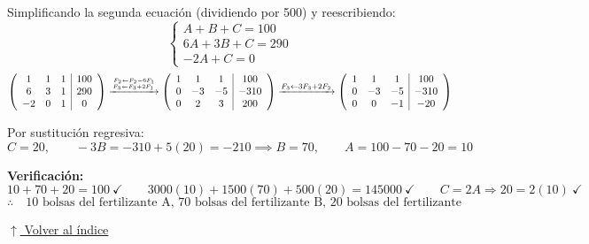 \documentclass[12pt]{article}
\newcommand{\volverindice}{%
    \vspace{1em}%
    \begin{flushright}%
        \hyperlink{indice}{\small $\uparrow$ Volver al índice}%
    \end{flushright}%
}
\begin{document}
Simplificando la segunda ecuación (dividiendo por 500) y reescribiendo:
\[
\begin{cases}
A + B + C = 100\\
6A + 3B + C = 290\\
-2A + C = 0
\end{cases}
\]
\[
\left(\begin{array}{ccc|c}1&1&1&100\\6&3&1&290\\-2&0&1&0\end{array}\right)
\xrightarrow{F_2 \leftarrow F_2 - 6F_1 \atop F_3 \leftarrow F_3 + 2F_1}
\left(\begin{array}{ccc|c}1&1&1&100\\0&-3&-5&-310\\0&2&3&200\end{array}\right)
\xrightarrow{F_3 \leftarrow 3F_3 + 2F_2}
\left(\begin{array}{ccc|c}1&1&1&100\\0&-3&-5&-310\\0&0&-1&-20\end{array}\right)
\]

Por sustitución regresiva:
\[
C = 20, \qquad -3B = -310 + 5(20) = -210 \implies B = 70, \qquad A = 100 - 70 - 20 = 10
\]

\textbf{Verificación:}
\[
10+70+20=100\ \checkmark \qquad
3000(10)+1500(70)+500(20)=145000\ \checkmark \qquad
C=2A\Rightarrow20=2(10)\ \checkmark
\]
\[
\therefore\quad\text{10 bolsas del fertilizante A, 70 bolsas del fertilizante B, 20 bolsas del fertilizante C.}
\]

\volverindice
\end{document}
